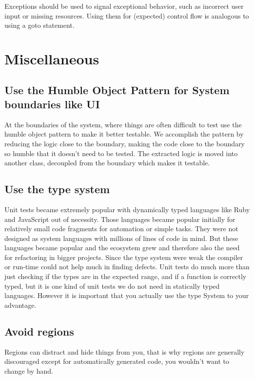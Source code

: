\documentclass[11pt,a4paper]{article}
\begin{document}
Exceptions should be used to signal exceptional behavior, such as incorrect user input or missing resources. Using them for (expected) control flow is analogous to using a goto statement.

\section{Miscellaneous}

\subsection{Use the Humble Object Pattern for System boundaries like UI}

At the boundaries of the system, where things are often difficult to test use the humble object pattern to make it better testable. We accomplish the pattern by reducing the logic close to the boundary, making the code close to the boundary so humble that it doesn't need to be tested. The extracted logic is moved into another class, decoupled from the boundary which makes it testable.

\subsection{Use the type system}

Unit tests became extremely popular with dynamically typed languages like Ruby and JavaScript out of necessity. Those languages became popular initially for relatively small code fragments for automation or simple tasks. They were not designed as system languages with millions of lines of code in mind. But these languages became popular and the ecosystem grew and therefore also the need for refactoring in bigger projects. Since the type system were weak the compiler or run-time could not help much in finding defects. 
Unit tests do much more than just checking if the types are in the expected range, and if a function is correctly typed, but it is one kind of unit tests we do not need in statically typed languages. However it is important that you actually use the type System to your advantage.

\subsection{Avoid regions}

Regions can distract and hide things from you, that is why regions are generally discouraged except for automatically generated code, you wouldn't want to change by hand.
\end{document}
